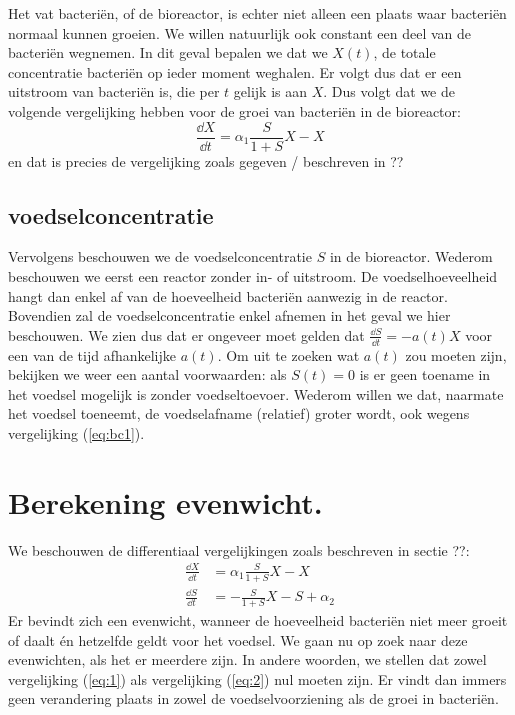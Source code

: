 Het vat bacteri\"en, of de bioreactor, is echter niet alleen een plaats waar bacteri\"en normaal kunnen groeien. We willen natuurlijk ook constant een deel van de bacteri\"en wegnemen. In dit geval bepalen we dat we $X(t)$, de totale concentratie bacteri\"en op ieder moment weghalen. Er volgt dus dat er een uitstroom van bacteri\"en is, die per $t$ gelijk is aan $X$. Dus volgt dat we de volgende vergelijking hebben voor de groei van bacteri\"en in de bioreactor:
\begin{equation}
	\frac{\dd X}{\dd t} = \alpha_1 \frac{S}{1+S} X - X 		\label{eq:bc1}
\end{equation}
en dat is precies de vergelijking zoals gegeven / beschreven in ??%


\subsection*{voedselconcentratie}
Vervolgens beschouwen we de voedselconcentratie $S$ in de bioreactor. Wederom beschouwen we eerst een reactor zonder in- of uitstroom. De voedselhoeveelheid hangt dan enkel af van de hoeveelheid bacteri\"en aanwezig in de reactor. Bovendien zal de voedselconcentratie enkel afnemen in het geval we hier beschouwen. We zien dus dat er ongeveer moet gelden dat $\tfrac{\dd S}{\dd t} = - a(t) X$ voor een van de tijd afhankelijke $a(t)$. Om uit te zoeken wat $a(t)$ zou moeten zijn, bekijken we weer een aantal voorwaarden: als $S(t) = 0$ is er geen toename in het voedsel mogelijk is zonder voedseltoevoer. Wederom willen we dat, naarmate het voedsel toeneemt, de voedselafname (relatief) groter wordt, ook wegens vergelijking (\ref{eq:bc1}). 



\section{Berekening evenwicht.}
We beschouwen de differentiaal vergelijkingen zoals beschreven in sectie ??: %
\begin{align}
	\frac{\dd X}{\dd t} &= \alpha_1 \frac{S}{1 + S} X - X 			\label{eq:1}	\\
	\frac{\dd S}{\dd t} &= - \frac{S}{1 + S}X - S + \alpha_2 		\label{eq:2}
\end{align}
Er bevindt zich een evenwicht, wanneer de hoeveelheid bacteri\"en niet meer groeit of daalt \'en hetzelfde geldt voor het voedsel. We gaan nu op zoek naar deze evenwichten, als het er meerdere zijn. In andere woorden, we stellen dat zowel vergelijking (\ref{eq:1}) als vergelijking (\ref{eq:2}) nul moeten zijn. Er vindt dan immers geen verandering plaats in zowel de voedselvoorziening als de groei in bacteri\"en. 

